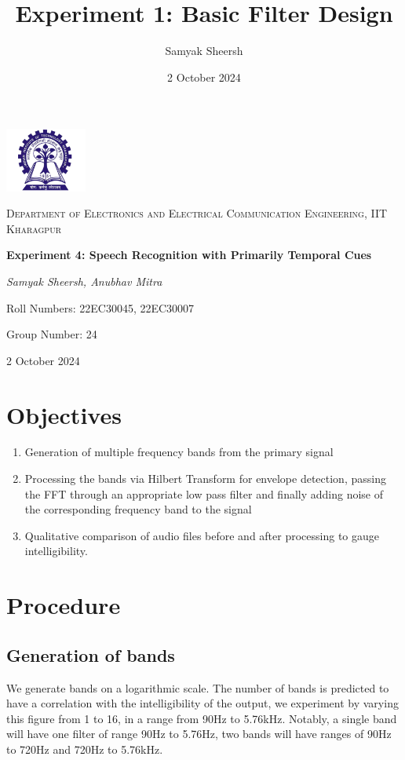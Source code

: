 \documentclass{article}
\title{Experiment 1: Basic Filter Design}
\author{Samyak Sheersh}
\date{2 October 2024}
\begin{document}
\begin{titlepage}
    \centering
    \includegraphics[width=0.2\textwidth]{KGP_logo.png}\par\vspace{1cm}
    {\scshape\LARGE Department of Electronics and Electrical Communication Engineering, IIT Kharagpur\par}
    \vspace{1cm}
    {\huge\bfseries Experiment 4: Speech Recognition with Primarily Temporal Cues\par}
    \vspace{1.5cm}
    {\Large\itshape Samyak Sheersh, Anubhav Mitra\par}
    \vfill
    {\large Roll Numbers: 22EC30045, 22EC30007\par}
    {\large Group Number: 24\par}
    \vfill
    {\large 2 October 2024\par}
\end{titlepage}

\section{Objectives}
\begin{enumerate}
  \item Generation of multiple frequency bands from the primary signal 
  \item Processing the bands via Hilbert Transform for envelope detection, passing the FFT through an appropriate low pass filter and finally adding noise of the corresponding frequency band to the signal
  \item Qualitative comparison of audio files before and after processing to gauge intelligibility.
\end{enumerate}

\section{Procedure}
\subsection{Generation of bands}
We generate bands on a logarithmic scale. The number of bands is predicted
to have a correlation with the intelligibility of the output, we experiment by
varying this figure from 1 to 16, in a range from 90Hz to 5.76kHz. Notably, a
single band will have one filter of range 90Hz to 5.76Hz, two bands will have
ranges of 90Hz to 720Hz and 720Hz to 5.76kHz.
\end{document}
